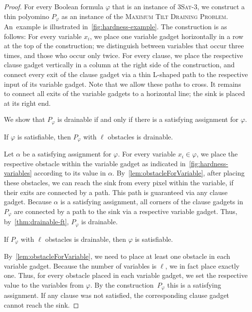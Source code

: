 \documentclass[a4paper,UKenglish,cleveref,thm-restate]{lipics-v2021}
\newcommand{\drainingProb}{\textsc{Maximum Tilt Draining Problem}}
\begin{document}
\begin{proof}
	For every Boolean formula $\varphi$ that is an instance of \textsc{3Sat-3}, we construct a thin polyomino $P_\varphi$ as an instance of the \drainingProb.
	An~example is illustrated in~\cref{fig:hardness-example}.
	The construction is as follows:
	For every variable $x_i$, we place one variable gadget horizontally in a row at the top of the construction; we distinguish between variables that occur three times, and those who occur only twice.
	For every clause, we place the respective clause gadget vertically in a column at the right side of the construction, and connect every exit of the clause gadget via a thin L-shaped path to the respective input of its variable gadget.
	Note that we allow these paths to cross.
	It remains to connect all exits of the variable gadgets to a horizontal line; the sink is placed at its right end.
	
	We show that $P_\varphi$ is drainable if and only if there is a satisfying assignment for $\varphi$.
	
	\begin{claim}
		If $\varphi$ is satisfiable, then $P_\varphi$ with $\ell$ obstacles is drainable.
	\end{claim}
	
	Let $\alpha$ be a satisfying assignment for $\varphi$.
	For every variable $x_i\in \varphi$, we place the respective obstacle within the variable gadget as indicated in~\cref{fig:hardness-variables} according to its value in $\alpha$.
	By~\cref{lem:obstacleForVariable}, after placing these obstacles, we can reach the sink from every pixel within the variable, if their exits are connected by a path.
	This path is guaranteed via any clause gadget.
	Because $\alpha$ is a satisfying assignment, all corners of the clause gadgets in $P_\varphi$ are connected by a path to the sink via a respective variable gadget.
	Thus, by~\cref{thm:drainable-ft}, $P_\varphi$ is drainable.
	
	\begin{claim}
		If $P_\varphi$ with $\ell$ obstacles is drainable, then $\varphi$ is satisfiable.
	\end{claim}
	By~\cref{lem:obstacleForVariable}, we need to place at least one obstacle in each variable gadget.
	Because the number of variables is $\ell$, we in fact place exactly one.
	Thus, for every obstacle placed in each variable gadget, we set the respective value to the variables from $\varphi$.
	By the construction~$P_\varphi$ this is a satisfying assignment.
	If any clause was not satisfied, the corresponding clause gadget cannot reach the sink.
\end{proof}
\end{document}

